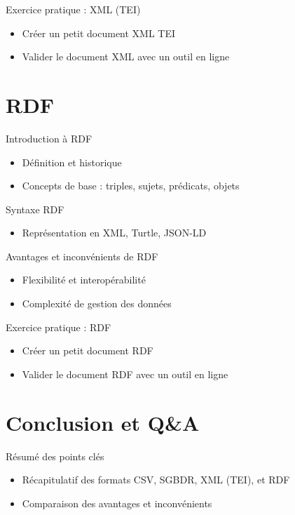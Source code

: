 \documentclass{beamer}
\begin{document}
\begin{frame}{Exercice pratique : XML (TEI)}
    \begin{itemize}
        \item Créer un petit document XML TEI
        \item Valider le document XML avec un outil en ligne
    \end{itemize}
\end{frame}

\section{RDF}

\begin{frame}{Introduction à RDF}
    \begin{itemize}
        \item Définition et historique
        \item Concepts de base : triples, sujets, prédicats, objets
    \end{itemize}
\end{frame}

\begin{frame}{Syntaxe RDF}
    \begin{itemize}
        \item Représentation en XML, Turtle, JSON-LD
    \end{itemize}
\end{frame}

\begin{frame}{Avantages et inconvénients de RDF}
    \begin{itemize}
        \item Flexibilité et interopérabilité
        \item Complexité de gestion des données
    \end{itemize}
\end{frame}

\begin{frame}{Exercice pratique : RDF}
    \begin{itemize}
        \item Créer un petit document RDF
        \item Valider le document RDF avec un outil en ligne
    \end{itemize}
\end{frame}

\section{Conclusion et Q\&A}

\begin{frame}{Résumé des points clés}
    \begin{itemize}
        \item Récapitulatif des formats CSV, SGBDR, XML (TEI), et RDF
        \item Comparaison des avantages et inconvénients
    \end{itemize}
\end{frame}
\end{document}
